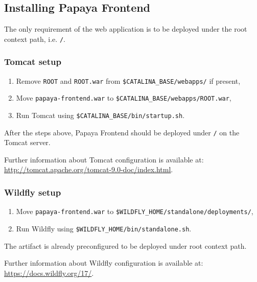 \subsection{Installing Papaya Frontend}\label{subsec:installing-papaya-frontend}

The only requirement of the web application is to be deployed under the root
context path, i.e. \texttt{/}.

\subsubsection*{Tomcat setup}

\begin{enumerate}
    \item Remove \texttt{ROOT} and \texttt{ROOT.war} from
    \texttt{\$CATALINA\_BASE/webapps/} if present,

    \item Move \texttt{papaya-frontend.war} to
    \texttt{\$CATALINA\_BASE/webapps/ROOT.war},

    \item Run Tomcat using \texttt{\$CATALINA\_BASE/bin/startup.sh}.
\end{enumerate}

After the steps above, Papaya Frontend should be deployed under \texttt{/}
on the Tomcat server.

Further information about Tomcat configuration is available at:
\url{http://tomcat.apache.org/tomcat-9.0-doc/index.html}.

\subsubsection*{Wildfly setup}

\begin{enumerate}
    \item Move \texttt{papaya-frontend.war} to
    \texttt{\$WILDFLY\_HOME/standalone/deployments/},

    \item Run Wildfly using \texttt{\$WILDFLY\_HOME/bin/standalone.sh}.
\end{enumerate}

The artifact is already preconfigured to be deployed under root context path.

Further information about Wildfly configuration is available at:
\url{https://docs.wildfly.org/17/}.
